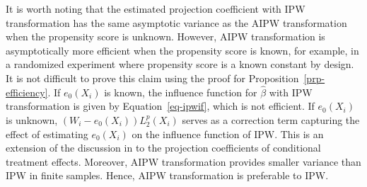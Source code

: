 \documentclass[
  12pt,
  12pt]{article}
\numberwithin{equation}{section}
\theoremstyle{definition}
\theoremstyle{plain}
\theoremstyle{plain}
\theoremstyle{remark}
\begin{document}
It is worth noting that the estimated projection coefficient with IPW
transformation has the same asymptotic variance as the AIPW
transformation when the propensity score is unknown. However, AIPW
transformation is asymptotically more efficient when the propensity
score is known, for example, in a randomized experiment where propensity
score is a known constant by design. It is not difficult to prove this
claim using the proof for Proposition~\ref{prp-efficiency}. If
\(e_0(X_i)\) is known, the influence function for \(\hat\beta\) with IPW
transformation is given by Equation~\ref{eq-ipwif}, which is not
efficient. If \(e_0(X_i)\) is unknown, \((W_i - e_0(X_i))L^p_2(X_i)\)
serves as a correction term capturing the effect of estimating
\(e_0(X_i)\) on the influence function of IPW. This is an extension of
the discussion in \citet{hirano2003efficient} to the projection
coefficients of conditional treatment effects. Moreover, AIPW
transformation provides smaller variance than IPW in finite samples.
Hence, AIPW transformation is preferable to IPW.
\end{document}
